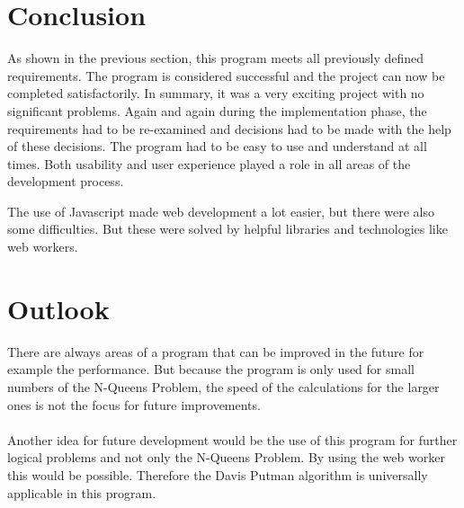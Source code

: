 \section{Conclusion}
\label{sec:proConclusion}
As shown in the previous section, this program meets all previously defined requirements. The program is considered successful and the project can now be completed satisfactorily. In summary, it was a very exciting project with no significant problems. Again and again during the implementation phase, the requirements had to be re-examined and decisions had to be made with the help of these decisions. The program had to be easy to use and understand at all times. Both usability and user experience played a role in all areas of the development process. 

The use of Javascript made web development a lot easier, but there were also some difficulties. But these were solved by helpful libraries and technologies like web workers. 

\section{Outlook}
\label{sec:proOutlook}

There are always areas of a program that can be improved in the future for example the performance. But because the program is only used for small numbers of the N-Queens Problem, the speed of the calculations for the larger ones is not the focus for future improvements.  \\
\\
Another idea for future development would be the use of this program for further logical problems and not only the N-Queens Problem. By using the web worker this would be possible. Therefore the Davis Putman algorithm is universally applicable in this program.
